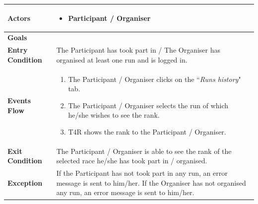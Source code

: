             \begin{table}[H]
            	\centering
                
                \begin{tabular}{|p{3cm}|p{8.2cm}|}
                    \hline
                    \textbf{Actors} & \begin{itemize}
                                            \item Participant / Organiser
                                        \end{itemize} \\
                     \hline
                    \textbf{Goals} & \\ 
                     \hline
                    \textbf{Entry Condition} & The Participant has took part in / The Organiser has organised at least                              one run and is logged in. \\
                     \hline
                    \textbf{Events Flow} & \begin{enumerate}
                                                \item The Participant / Organiser clicks on the ``\emph{Runs history}" tab.
                                                \item The Participant / Organiser selects the run of which he/she wishes to see the rank.
                                                \item T4R shows the rank to the Participant / Organiser.
                                            \end{enumerate} \\
                     \hline
                    \textbf{Exit Condition} & The Participant / Organiser is able to see the rank of the selected race                             he/she has took part in / organised. \\
                     \hline
                    \textbf{Exception} & If the Participant has not took part in any run, an error                       message is sent to him/her. \newline
                                         If the Organiser has not organised any run, an error message is sent to him/her. \\
                     \hline
                \end{tabular}  
            \end{table}
            
